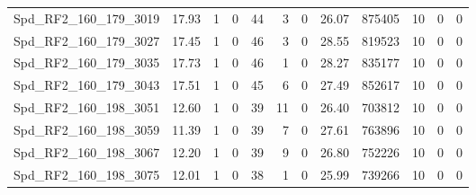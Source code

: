 \begin{longtable}[c]{@{}lrrrrrrrrrrr@{}}
Spd\_RF2\_160\_179\_3019      & 17.93                  & 1                       & 0                       & 44                     & 3                       & 0                       & 26.07                   & 875405                   & 10                       & 0                        & 0                        \\
Spd\_RF2\_160\_179\_3027      & 17.45                  & 1                       & 0                       & 46                     & 3                       & 0                       & 28.55                   & 819523                   & 10                       & 0                        & 0                        \\
Spd\_RF2\_160\_179\_3035      & 17.73                  & 1                       & 0                       & 46                     & 1                       & 0                       & 28.27                   & 835177                   & 10                       & 0                        & 0                        \\
Spd\_RF2\_160\_179\_3043      & 17.51                  & 1                       & 0                       & 45                     & 6                       & 0                       & 27.49                   & 852617                   & 10                       & 0                        & 0                        \\
Spd\_RF2\_160\_198\_3051      & 12.60                  & 1                       & 0                       & 39                     & 11                      & 0                       & 26.40                   & 703812                   & 10                       & 0                        & 0                        \\
Spd\_RF2\_160\_198\_3059      & 11.39                  & 1                       & 0                       & 39                     & 7                       & 0                       & 27.61                   & 763896                   & 10                       & 0                        & 0                        \\
Spd\_RF2\_160\_198\_3067      & 12.20                  & 1                       & 0                       & 39                     & 9                       & 0                       & 26.80                   & 752226                   & 10                       & 0                        & 0                        \\
Spd\_RF2\_160\_198\_3075      & 12.01                  & 1                       & 0                       & 38                     & 1                       & 0                       & 25.99                   & 739266                   & 10                       & 0                        & 0                        \\

\end{longtable}
